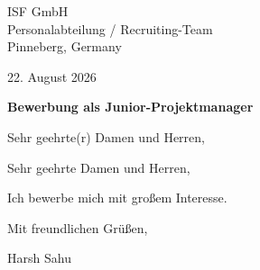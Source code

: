 \documentclass[10pt,a4paper]{article}
\begin{document}

ISF GmbH\\

Personalabteilung / Recruiting-Team\\

Pinneberg, Germany

\vspace{10pt}
22. August 2026

\vspace{10pt}
\textbf{Bewerbung als Junior-Projektmanager}


\vspace{8pt}
Sehr geehrte(r) Damen und Herren,


Sehr geehrte Damen und Herren,

\vspace{4pt}

Ich bewerbe mich mit großem Interesse.

\vspace{4pt}


Mit freundlichen Grüßen,

\vspace{14pt}
Harsh Sahu
\end{document}
